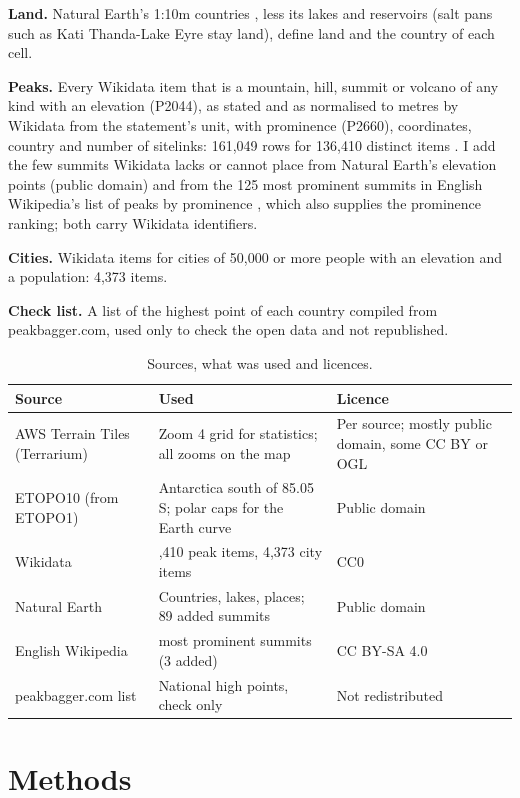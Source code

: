 \documentclass[11pt,a4paper]{article}
\begin{document}
\textbf{Land.} Natural Earth's 1:10m countries \citep{naturalearth}, less its lakes and reservoirs (salt pans such as Kati Thanda-Lake Eyre stay land), define land and the country of each cell.

\textbf{Peaks.} Every Wikidata item that is a mountain, hill, summit or volcano of any kind with an elevation (P2044), as stated and as normalised to metres by Wikidata from the statement's unit, with prominence (P2660), coordinates, country and number of sitelinks: 161,049 rows for 136,410 distinct items \citep{wikidata}. I add the few summits Wikidata lacks or cannot place from Natural Earth's elevation points (public domain) and from the 125 most prominent summits in English Wikipedia's list of peaks by prominence \citep{wpprom}, which also supplies the prominence ranking; both carry Wikidata identifiers.

\textbf{Cities.} Wikidata items for cities of 50,000 or more people with an elevation and a population: 4,373 items.

\textbf{Check list.} A list of the highest point of each country compiled from peakbagger.com, used only to check the open data and not republished.

\begin{table}[tbp]\centering\small\caption{Sources, what was used and licences.}\label{tab:sources}\begin{tabular}{>{\raggedright\arraybackslash}p{3.6cm}>{\raggedright\arraybackslash}p{7.4cm}>{\raggedright\arraybackslash}p{3.4cm}}\toprule Source & Used & Licence\\\midrule
AWS Terrain Tiles (Terrarium) & Zoom 4 grid for statistics; all zooms on the map & Per source; mostly public domain, some CC BY or OGL\\
ETOPO10 (from ETOPO1) & Antarctica south of 85.05 S; polar caps for the Earth curve & Public domain\\
Wikidata & 136,410 peak items, 4,373 city items & CC0\\
Natural Earth & Countries, lakes, places; 89 added summits & Public domain\\
English Wikipedia & 125 most prominent summits (3 added) & CC BY-SA 4.0\\
peakbagger.com list & National high points, check only & Not redistributed\\
\bottomrule\end{tabular}\end{table}

\section{Methods}
\end{document}
